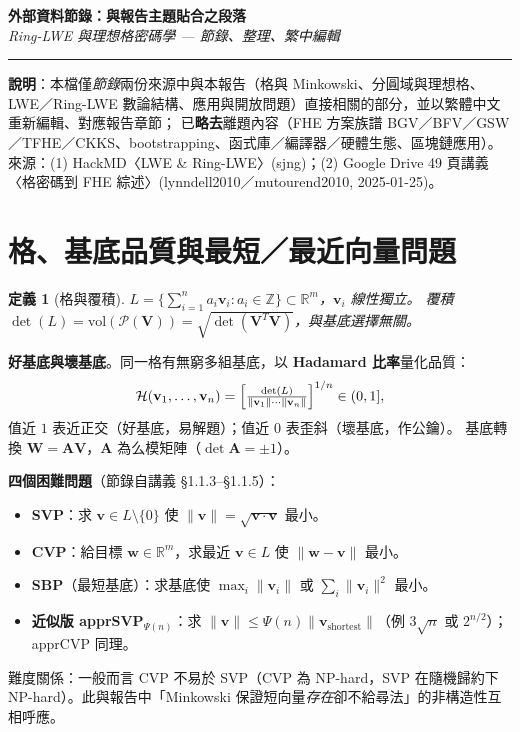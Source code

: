 \documentclass[10.5pt, a4paper]{article}
\theoremstyle{cpt}
\newtheorem{definition}{定義}
\newenvironment{maps}[1]{%
  \begin{tcolorbox}[colback=mapfill, colframe=accent!30, breakable,
    left=5pt, right=5pt, top=2pt, bottom=2pt, boxrule=0.4pt,
    title={\footnotesize\bfseries 對應報告：#1}, coltitle=white, colbacktitle=accent!70!black]\small
}{\end{tcolorbox}\vspace{-1pt}}
\newcommand{\R}{\mathbb{R}}
\newcommand{\Z}{\mathbb{Z}}
\newcommand{\vol}{\mathrm{vol}}
\begin{document}
\begin{center}
  {\LARGE\bfseries\color{accent} 外部資料節錄：與報告主題貼合之段落}\\[2pt]
  {\small\itshape\color{accent} Ring-LWE 與理想格密碼學 — 節錄、整理、繁中編輯}\\[4pt]
  \rule{\linewidth}{0.8pt}
\end{center}

{\footnotesize\color{gray}
\textbf{說明}：本檔僅\emph{節錄}兩份來源中與本報告（格與 Minkowski、分圓域與理想格、LWE／Ring-LWE 數論結構、應用與開放問題）直接相關的部分，並以繁體中文重新編輯、對應報告章節；
已\textbf{略去}離題內容（FHE 方案族譜 BGV／BFV／GSW／TFHE／CKKS、bootstrapping、函式庫／編譯器／硬體生態、區塊鏈應用）。
來源：(1) HackMD〈LWE \& Ring-LWE〉(sjng)；(2) Google Drive 49 頁講義〈格密碼到 FHE 綜述〉(lynndell2010／mutourend2010, 2025-01-25)。}

\section{格、基底品質與最短／最近向量問題}

\begin{maps}{Section 1（格與 Minkowski）、SVP／CVP 兩頁}\end{maps}

\begin{definition}[格與覆積]
  $L=\{\sum_{i=1}^n a_i\mathbf{v}_i:a_i\in\Z\}\subset\R^m$，$\mathbf{v}_i$ 線性獨立。
  覆積 $\det(L)=\vol(\mathcal{P}(\mathbf{V}))=\sqrt{\det(\mathbf{V}^T\mathbf{V})}$，與基底選擇無關。
\end{definition}

\textbf{好基底與壞基底}。同一格有無窮多組基底，以 \textbf{Hadamard 比率}量化品質：
\[
  \mathcal{H}(\mathbf{v}_1,\dots,\mathbf{v}_n)=\Bigl[\tfrac{\det(L)}{\|\mathbf{v}_1\|\cdots\|\mathbf{v}_n\|}\Bigr]^{1/n}\in(0,1],
\]
值近 $1$ 表近正交（好基底，易解題）；值近 $0$ 表歪斜（壞基底，作公鑰）。
基底轉換 $\mathbf{W}=\mathbf{A}\mathbf{V}$，$\mathbf{A}$ 為么模矩陣（$\det\mathbf{A}=\pm1$）。

\textbf{四個困難問題}（節錄自講義 §1.1.3–§1.1.5）：
\begin{itemize}
  \item \textbf{SVP}：求 $\mathbf{v}\in L\setminus\{0\}$ 使 $\|\mathbf{v}\|=\sqrt{\mathbf{v}\cdot\mathbf{v}}$ 最小。
  \item \textbf{CVP}：給目標 $\mathbf{w}\in\R^m$，求最近 $\mathbf{v}\in L$ 使 $\|\mathbf{w}-\mathbf{v}\|$ 最小。
  \item \textbf{SBP}（最短基底）：求基底使 $\max_i\|\mathbf{v}_i\|$ 或 $\sum_i\|\mathbf{v}_i\|^2$ 最小。
  \item \textbf{近似版 apprSVP$_{\Psi(n)}$}：求 $\|\mathbf{v}\|\le\Psi(n)\|\mathbf{v}_{\text{shortest}}\|$（例 $3\sqrt{n}$ 或 $2^{n/2}$）；apprCVP 同理。
\end{itemize}
難度關係：一般而言 CVP 不易於 SVP（CVP 為 NP-hard，SVP 在隨機歸約下 NP-hard）。此與報告中「Minkowski 保證短向量\emph{存在}卻不給尋法」的非構造性互相呼應。
\end{document}
